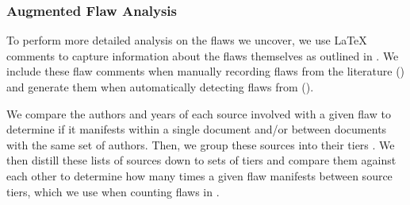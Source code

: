 \subsubsection{Augmented Flaw Analysis}\label{aug-flaw-analysis}

To perform more detailed analysis on the flaws we uncover, we use \LaTeX{}
comments to capture information about the flaws themselves as outlined in
. We include these flaw comments when manually recording
flaws from the literature () and generate them when
automatically detecting flaws from \ourApproachGlossary{}
().

We compare the authors and years of each source involved with a given flaw
to determine if it manifests within a single document and/or between documents
with the same set of authors. Then, we group these sources into their tiers
.
We then distill these lists of sources down to sets of tiers and compare them
against each other to determine how many times a given flaw manifests between
source tiers, which we use when counting flaws in .


